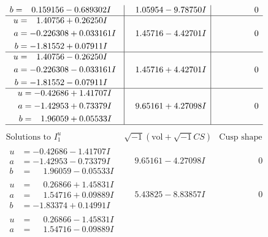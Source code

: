 \documentclass[1p]{elsarticle_modified}
\theoremstyle{definition}
\newcommand{\I}{\sqrt{-1}}
\begin{document}
$$\begin{array}{c|c|c}
\begin{aligned}
b &= \phantom{-}0.159156 - 0.689302 I\end{aligned}
 & \phantom{-}1.05954 - 9.78750 I & \phantom{-0.000000 } 0 \\ \hline\begin{aligned}
u &= \phantom{-}1.40756 + 0.26250 I \\
a &= -0.226308 + 0.033161 I \\
b &= -1.81552 + 0.07911 I\end{aligned}
 & \phantom{-}1.45716 - 4.42701 I & \phantom{-0.000000 } 0 \\ \hline\begin{aligned}
u &= \phantom{-}1.40756 - 0.26250 I \\
a &= -0.226308 - 0.033161 I \\
b &= -1.81552 - 0.07911 I\end{aligned}
 & \phantom{-}1.45716 + 4.42701 I & \phantom{-0.000000 } 0 \\ \hline\begin{aligned}
u &= -0.42686 + 1.41707 I \\
a &= -1.42953 + 0.73379 I \\
b &= \phantom{-}1.96059 + 0.05533 I\end{aligned}
 & \phantom{-}9.65161 + 4.27098 I & \phantom{-0.000000 } 0\\
 \hline 
 \end{array}$$\newpage$$\begin{array}{c|c|c}  
\text{Solutions to }I^u_{1}& \I (\text{vol} + \sqrt{-1}CS) & \text{Cusp shape}\\
 \hline 
\begin{aligned}
u &= -0.42686 - 1.41707 I \\
a &= -1.42953 - 0.73379 I \\
b &= \phantom{-}1.96059 - 0.05533 I\end{aligned}
 & \phantom{-}9.65161 - 4.27098 I & \phantom{-0.000000 } 0 \\ \hline\begin{aligned}
u &= \phantom{-}0.26866 + 1.45831 I \\
a &= \phantom{-}1.54716 + 0.09889 I \\
b &= -1.83374 + 0.14991 I\end{aligned}
 & \phantom{-}5.43825 - 8.83857 I & \phantom{-0.000000 } 0 \\ \hline\begin{aligned}
u &= \phantom{-}0.26866 - 1.45831 I \\
a &= \phantom{-}1.54716 - 0.09889 I \\

\end{aligned}
\end{array}$$
\end{document}
